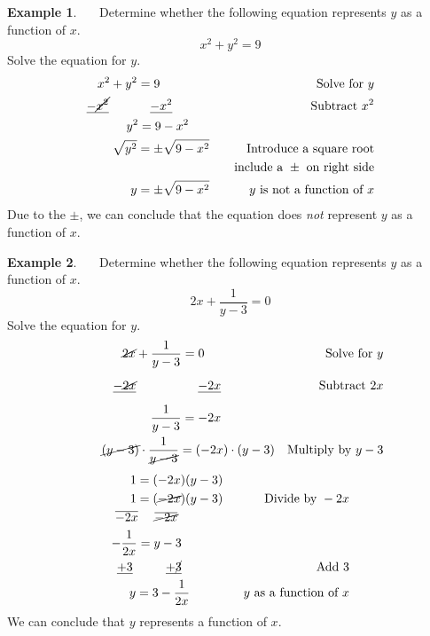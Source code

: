 \documentclass[12pt]{book}
\theoremstyle{definition}
\newtheorem{example}{Example}
\begin{document}
\begin{example}~~~Determine whether the following equation represents $y$ as a function of $x$.
$$x^2+y^2=9$$
Solve the equation for $y$.
  \begin{eqnarray*}
    x^2+y^2=9~~~~~~~~~~~~  & & \text{Solve~for~} y\\
    \underline{-\cancel{x^2}}~~~~~~~~~~\underline{-x^2}~~~~~~~~~  & & \text{Subtract~} x^2\\
    y^2=9-x^2~~~~~  & & \\
	  \sqrt{y^2}=\pm\sqrt{9-x^2}  & & \text{Introduce~a~square~root}\\
		& & \text{~~~include a~} \pm \text{~on~right~side}\\
	  y=\pm\sqrt{9-x^2}  & & y \text{~is~not~a~function~of~}x\\
	\end{eqnarray*}
Due to the $\pm$, we can conclude that the equation does \textit{not} represent $y$ as a function of $x$.
\end{example}
\begin{example}~~~Determine whether the following equation represents $y$ as a function of $x$.
$$2x+\dfrac{1}{y-3}=0$$
 Solve the equation for $y$.
  \begin{eqnarray*}
    \cancel{2x}+\dfrac{1}{y-3}=0~~~~~~~~~~~~~~~~~  & & \text{Solve~for~} y\\
		\underline{-\cancel{2x}}\phantom{+\dfrac{1}{y-3}=}~~\underline{-2x}~~~~~~~~~~~~~ && \text{Subtract~} 2x\\
    ~~~\dfrac{1}{y-3}=-2x~~~~~~~~~~~~~  & & \\
    ~~~~~~\cancel{(y-3)}\cdot\dfrac{1}{\cancel{y-3}}=(-2x)\cdot(y-3)  & & \text{Multiply~by~} y-3%
	\end{eqnarray*}
	\begin{eqnarray*}
		1=(-2x)(y-3)~~ & & \\
		1=(\cancel{-2x})(y-3)~~ & & \text{Divide~by~}-2x\\
		\overline{-2x}~~~~\overline{\cancel{-2x}}~~~~~~~~~~~~~ &&\\
		-\dfrac{1}{2x}=y-3~~~~~~~~~~~~&&\\
		\underline{+3}~~~~~~~~\underline{+\cancel{3}}~~~~~~~~~~~~ & &\text{Add~}3\\
		y=3-\dfrac{1}{2x}~~~~~~~~~~ & & y \text{~as~a~function~of~} x
	\end{eqnarray*}
We can conclude that $y$ represents a function of $x$.
 \end{example}
\end{document}
